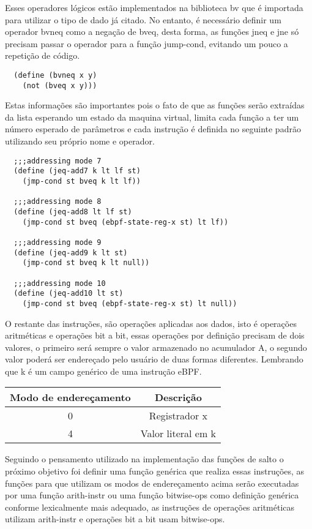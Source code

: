 \documentclass[paper=a4, fontsize=12pt]{article}
\theoremstyle{definition}
\begin{document}
Esses operadores lógicos estão implementados na biblioteca bv que é importada para utilizar o tipo de dado
já citado. No entanto, é necessário definir um operador bvneq como a negação de bveq, desta forma, as funções
jneq e jne só precisam passar o operador para a função jump-cond, evitando um pouco a repetição de código. 

\begin{lstlisting}
  (define (bvneq x y)
    (not (bveq x y)))
\end{lstlisting}

Estas informações são importantes pois o fato de que as funções serão extraídas da lista esperando um estado
da maquina virtual, limita cada função a ter um número esperado de parâmetros e cada instrução é definida no
seguinte padrão utilizando seu próprio nome e operador.

\begin{lstlisting}
  ;;;addressing mode 7
  (define (jeq-add7 k lt lf st)
    (jmp-cond st bveq k lt lf))

  ;;;addressing mode 8
  (define (jeq-add8 lt lf st)
    (jmp-cond st bveq (ebpf-state-reg-x st) lt lf))

  ;;;addressing mode 9
  (define (jeq-add9 k lt st)
    (jmp-cond st bveq k lt null))

  ;;;addressing mode 10
  (define (jeq-add10 lt st)
    (jmp-cond st bveq (ebpf-state-reg-x st) lt null))
\end{lstlisting}

O restante das instruções, são operações aplicadas aos dados, isto é operações aritméticas e operações bit a bit,
essas operações por definição precisam de dois valores, o primeiro será sempre o valor armazenado no acumulador A, o
segundo valor poderá ser endereçado pelo usuário de duas formas diferentes.
Lembrando que k é um campo genérico de uma instrução eBPF.

\begin{center}
  \begin{tabular}{ |c|c| }
    \hline
    Modo de endereçamento & Descrição\\
    \hline
    0 & Registrador x\\
    \hline
    4 & Valor literal em k\\
    \hline
  \end{tabular}
  \end{center}

Seguindo o pensamento utilizado na implementação das funções de salto o próximo objetivo foi definir uma função genérica que realiza
essas instruções, as funções para que utilizam os modos de endereçamento acima serão executadas por uma função arith-instr ou uma
função bitwise-ops como definição genérica conforme lexicalmente mais adequado, as instruções de operações aritméticas utilizam
arith-instr e operações bit a bit usam bitwise-ops. 
\end{document}
